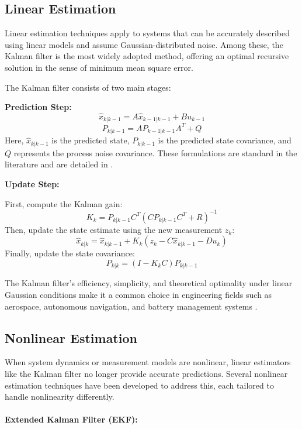 \subsection{Linear Estimation}

Linear estimation techniques apply to systems that can be accurately described using linear models and assume Gaussian-distributed noise. Among these, the Kalman filter is the most widely adopted method, offering an optimal recursive solution in the sense of minimum mean square error.

The Kalman filter consists of two main stages:

\textbf{Prediction Step:}
\begin{equation}
    \hat{x}_{k|k-1} = A \hat{x}_{k-1|k-1} + B u_{k-1}
\end{equation}
\begin{equation}
    P_{k|k-1} = A P_{k-1|k-1} A^T + Q
\end{equation}
Here, $\hat{x}_{k|k-1}$ is the predicted state, $P_{k|k-1}$ is the predicted state covariance, and $Q$ represents the process noise covariance. These formulations are standard in the literature and are detailed in \cite{Söderström2002}.

\textbf{Update Step:}

First, compute the Kalman gain:
\begin{equation}
    K_k = P_{k|k-1} C^T (C P_{k|k-1} C^T + R)^{-1}
\end{equation}
Then, update the state estimate using the new measurement $z_k$:
\begin{equation}
    \hat{x}_{k|k} = \hat{x}_{k|k-1} + K_k (z_k - C \hat{x}_{k|k-1} - D u_k)
\end{equation}
Finally, update the state covariance:
\begin{equation}
    P_{k|k} = (I - K_k C) P_{k|k-1}
\end{equation}

The Kalman filter’s efficiency, simplicity, and theoretical optimality under linear Gaussian conditions make it a common choice in engineering fields such as aerospace, autonomous navigation, and battery management systems \cite{VENKATESWARLU2022373}.

\subsection{Nonlinear Estimation}

When system dynamics or measurement models are nonlinear, linear estimators like the Kalman filter no longer provide accurate predictions. Several nonlinear estimation techniques have been developed to address this, each tailored to handle nonlinearity differently.
\\
\\
\textbf{Extended Kalman Filter (EKF):}

